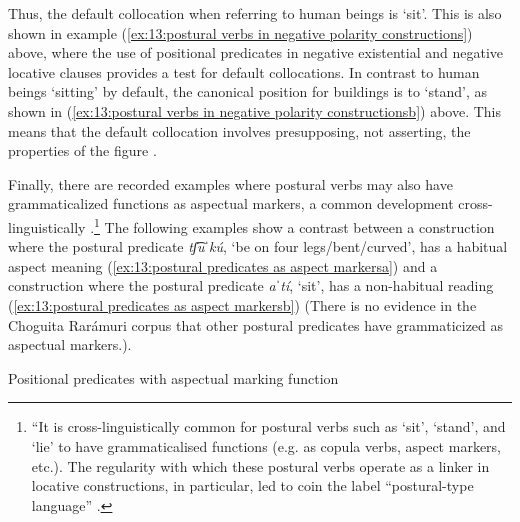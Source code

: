 Thus, the default collocation when referring to human beings is `sit'. This is also shown in example (\ref{ex:13:postural verbs in negative polarity constructions}) above, where the use of positional predicates in negative existential and negative locative clauses provides a test for default collocations. In contrast to human beings `sitting' by default, the canonical position for buildings is to `stand', as shown in (\ref{ex:13:postural verbs in negative polarity constructionsb}) above. This means that the default collocation involves presupposing, not asserting, the properties of the figure \citep[][859]{ameka2007introduction}.


Finally, there are recorded examples where postural verbs may also have grammaticalized functions as aspectual markers, a common development cross-linguis\-tically \parencite{ameka2007introduction}.\footnote{“It is cross-linguistically common for postural verbs such as `sit', `stand', and `lie' to have grammaticalised functions (e.g. as copula verbs, aspect markers, etc.).  The regularity with which these postural verbs operate as a linker in locative constructions, in particular, led \citet{ameka2007introduction} to coin the label ``postural-type language'' \citep[][461]{gaby2006grammar}.} The following examples show a contrast between a construction where the postural predicate \textit{tʃ͡uˈkú}, ‘be on four legs{\slash}bent{\slash}curved’, has a habitual aspect meaning (\ref{ex:13:postural predicates as aspect markersa}) and a construction where the postural predicate \textit{aˈtí}, ‘sit’, has a non-habitual reading (\ref{ex:13:postural predicates as aspect markersb}) (There is no evidence in the Choguita Rarámuri corpus that other postural predicates have grammaticized as aspectual markers.).

\ea\label{ex:13:postural predicates as aspect markers}
{Positional predicates with aspectual marking function}

